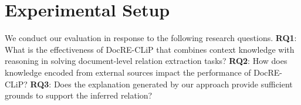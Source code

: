 \documentclass[letterpaper]{article} %
\begin{document}
\section{Experimental Setup}
We conduct our evaluation in response to the following research questions.
\textbf{RQ1}: What is the effectiveness of DocRE-CLiP that combines context knowledge with reasoning in solving document-level relation extraction tasks? \textbf{RQ2}: How does knowledge encoded from external sources impact the performance of DocRE-CLiP? \textbf{RQ3}: Does the explanation generated by our approach provide sufficient grounds to support the inferred relation?
\end{document}
